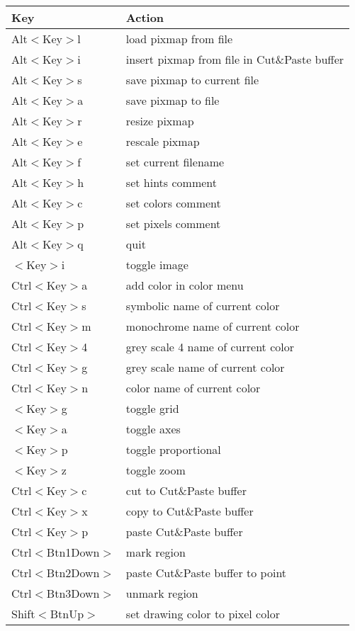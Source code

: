 \begin{tabular}{|p{4cm}|p{10cm}|}
\hline
Key			& Action\\\hline\hline
Alt$<$Key$>$l		& load pixmap from file\\\hline
Alt$<$Key$>$i		& insert pixmap from file in Cut\&Paste
buffer\\\hline
Alt$<$Key$>$s		& save pixmap to current file\\\hline
Alt$<$Key$>$a		& save pixmap to file\\\hline
Alt$<$Key$>$r		& resize pixmap\\\hline
Alt$<$Key$>$e		& rescale pixmap\\\hline
Alt$<$Key$>$f		& set current filename\\\hline
Alt$<$Key$>$h		& set hints comment\\\hline
Alt$<$Key$>$c		& set colors comment\\\hline
Alt$<$Key$>$p		& set pixels comment\\\hline
Alt$<$Key$>$q		& quit\\\hline
$<$Key$>$i		& toggle image\\\hline
Ctrl$<$Key$>$a		& add color in color menu\\\hline
Ctrl$<$Key$>$s		& symbolic name of current color\\\hline
Ctrl$<$Key$>$m		& monochrome name of current color\\\hline
Ctrl$<$Key$>$4		& grey scale 4 name of current color\\\hline
Ctrl$<$Key$>$g		& grey scale name of current color\\\hline
Ctrl$<$Key$>$n		& color name of current color\\\hline
$<$Key$>$g		& toggle grid\\\hline
$<$Key$>$a		& toggle axes\\\hline
$<$Key$>$p		& toggle proportional\\\hline
$<$Key$>$z		& toggle zoom\\\hline
Ctrl$<$Key$>$c		& cut to Cut\&Paste buffer\\\hline
Ctrl$<$Key$>$x		& copy to Cut\&Paste buffer\\\hline
Ctrl$<$Key$>$p		& paste Cut\&Paste buffer\\\hline
Ctrl$<$Btn1Down$>$	& mark region\\\hline
Ctrl$<$Btn2Down$>$	& paste Cut\&Paste buffer to point\\\hline
Ctrl$<$Btn3Down$>$	& unmark region\\\hline
Shift$<$BtnUp$>$	& set drawing color to pixel color\\\hline

\end{tabular}
